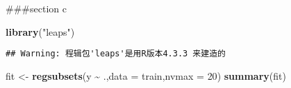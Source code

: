 \documentclass[
]{article}
\newenvironment{Shaded}{\begin{snugshade}}{\end{snugshade}}
\newcommand{\AttributeTok}[1]{\textcolor[rgb]{0.13,0.29,0.53}{#1}}
\newcommand{\DecValTok}[1]{\textcolor[rgb]{0.00,0.00,0.81}{#1}}
\newcommand{\FunctionTok}[1]{\textcolor[rgb]{0.13,0.29,0.53}{\textbf{#1}}}
\newcommand{\NormalTok}[1]{#1}
\newcommand{\OtherTok}[1]{\textcolor[rgb]{0.56,0.35,0.01}{#1}}
\newcommand{\SpecialCharTok}[1]{\textcolor[rgb]{0.81,0.36,0.00}{\textbf{#1}}}
\newcommand{\StringTok}[1]{\textcolor[rgb]{0.31,0.60,0.02}{#1}}
\begin{document}
\#\#\#section c

\begin{Shaded}
\begin{Highlighting}[]
\FunctionTok{library}\NormalTok{(}\StringTok{"leaps"}\NormalTok{)}
\end{Highlighting}
\end{Shaded}

\begin{verbatim}
## Warning: 程辑包'leaps'是用R版本4.3.3 来建造的
\end{verbatim}

\begin{Shaded}
\begin{Highlighting}[]
\NormalTok{fit }\OtherTok{\textless{}{-}} \FunctionTok{regsubsets}\NormalTok{(y }\SpecialCharTok{\textasciitilde{}}\NormalTok{ .,}\AttributeTok{data =}\NormalTok{ train,}\AttributeTok{nvmax =} \DecValTok{20}\NormalTok{)}
\FunctionTok{summary}\NormalTok{(fit)}
\end{Highlighting}
\end{Shaded}
\end{document}
